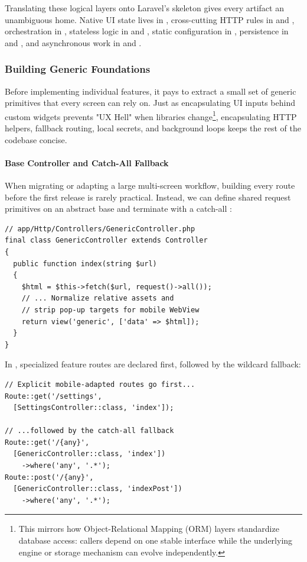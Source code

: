 \noindent Translating these logical layers onto Laravel's skeleton gives every artifact an
unambiguous home. Native UI state lives in ,
cross-cutting HTTP rules in  and , orchestration in
, stateless logic in  and , static
configuration in , persistence in  and
, and asynchronous work in  and .


\subsubsection{Building Generic Foundations}

Before implementing individual features, it pays to extract a small set of generic primitives
that every screen can rely on. Just as encapsulating UI inputs behind custom widgets prevents
"UX Hell" when libraries change\footnote{This mirrors how Object-Relational Mapping (ORM)
layers standardize database access: callers depend on one stable interface while the underlying
engine or storage mechanism can evolve independently.}, encapsulating HTTP helpers, fallback
routing, local secrets, and background loops keeps the rest of the codebase concise.

\paragraph{Base Controller and Catch-All Fallback}
When migrating or adapting a large multi-screen workflow, building every route before the first
release is rarely practical. Instead, we can define shared request primitives on an abstract
base  and terminate  with a catch-all :

\begin{lstlisting}[language=php8]
// app/Http/Controllers/GenericController.php
final class GenericController extends Controller
{
  public function index(string $url)
  {
    $html = $this->fetch($url, request()->all());
    // ... Normalize relative assets and
    // strip pop-up targets for mobile WebView
    return view('generic', ['data' => $html]);
  }
}
\end{lstlisting}

\noindent In , specialized feature routes are declared first, followed by the
wildcard fallback:

\begin{lstlisting}[language=php8]
// Explicit mobile-adapted routes go first...
Route::get('/settings',
  [SettingsController::class, 'index']);

// ...followed by the catch-all fallback
Route::get('/{any}',
  [GenericController::class, 'index'])
    ->where('any', '.*');
Route::post('/{any}',
  [GenericController::class, 'indexPost'])
    ->where('any', '.*');
\end{lstlisting}

